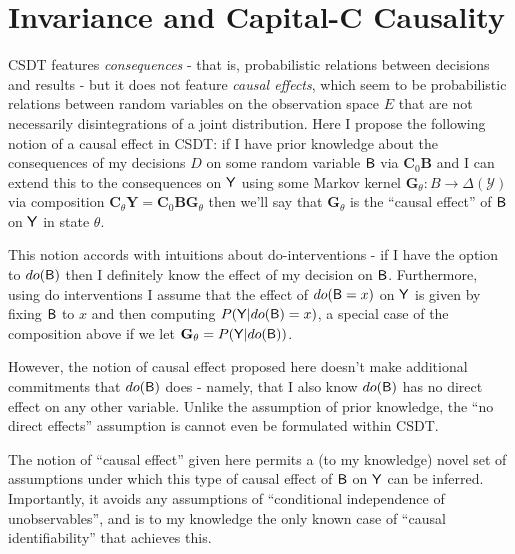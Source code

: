 
\section{Invariance and Capital-C Causality}

CSDT features \emph{consequences} - that is, probabilistic relations between decisions and results - but it does not feature \emph{causal effects}, which seem to be probabilistic relations between random variables on the observation space $E$ that are not necessarily disintegrations of a joint distribution. Here I propose the following notion of a causal effect in CSDT: if I have prior knowledge about the consequences of my decisions $D$ on some random variable $\mathsf{B}$ via $\mathbf{C}_0\mathbf{B}$ and I can extend this to the consequences on $\mathsf{Y}$ using some Markov kernel $\mathbf{G}_\theta:B\to \Delta(\mathcal{Y})$ via composition $\mathbf{C}_\theta \mathbf{Y} = \mathbf{C}_0\mathbf{B}\mathbf{G}_\theta$ then we'll say that $\mathbf{G}_\theta$ is the ``causal effect'' of $\mathsf{B}$ on $\mathsf{Y}$ in state $\theta$.

This notion accords with intuitions about do-interventions - if I have the option to $do(\mathsf{B})$ then I definitely know the effect of my decision on $\mathsf{B}$. Furthermore, using do interventions I assume that the effect of $do(\mathsf{B}=x)$ on $\mathsf{Y}$ is given by fixing $\mathsf{B}$ to $x$ and then computing $P(\mathsf{Y}|do(\mathsf{B})=x)$, a special case of the composition above if we let $\mathbf{G}_\theta=P(\mathsf{Y}|do(\mathsf{B}))$. 

However, the notion of causal effect proposed here doesn't make additional commitments that $do(\mathsf{B})$ does - namely, that I also know $do(\mathsf{B})$ has no direct effect on any other variable. Unlike the assumption of prior knowledge, the ``no direct effects'' assumption is cannot even be formulated within CSDT.

The notion of ``causal effect'' given here permits a (to my knowledge) novel set of assumptions under which this type of causal effect of $\mathsf{B}$ on $\mathsf{Y}$ can be inferred. Importantly, it avoids any assumptions of ``conditional independence of unobservables'', and is to my knowledge the only known case of ``causal identifiability'' that achieves this.

